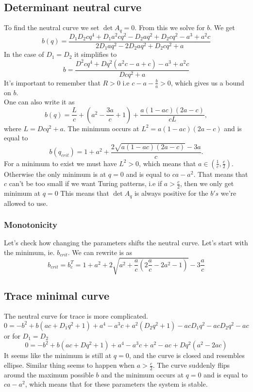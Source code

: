 \documentclass{article}
\begin{document}
\subsection{Determinant neutral curve}
To find the neutral curve we set 
$\det A_q = 0$. From this we solve for $b$. 
We get
\begin{equation}
b(q)=\frac{D_1 D_2 c q^4 + D_1 a^2 c q^2 - D_2 a q^2 + D_2 c q^2 - a^3 + a^2 c}{2 D_1 a q^2 - 2 D_2 a q^2 + D_2 c q^2 + a}
\end{equation}
In the case of $D_1=D_2$ it simplifies to
\begin{equation}
b=\frac{D^2 c q^4 +Dq^2(  a^2 c  -  a  +  c ) - a^3 + a^2 c}{D c q^2 + a} 
\end{equation}
It's important to remember that $R>0$ i.e $c-a-\frac{b}{a}>0$, which gives us a bound on $b$.\\
One can also write it as
\begin{equation}
b(q) = \frac{L}{c}+ (a^2-\frac{3a}{c}+1)+\frac{a(1-ac)(2a-c)}{cL},
\end{equation}
where $L= Dcq^2 + a$. The minimum occurs at $L^2 = a(1-ac)(2a-c)$ and is equal to 
\begin{equation}
b(q_{crit}) = 1+a^2 + \frac{2\sqrt{a(1-ac)(2a-c)}-3a}{c}.
\end{equation}
For a minimum to exist we must have $L^2>0$, which means that $a \in (\frac{1}{c}, \frac{c}{2})$. Otherwise the only minimum is at $q=0$ and is equal to $ca-a^2$. That means that $c$ can't be too small if we want Turing patterns, i.e if $a>\frac{c}{2}$, then we only get minimum at $q=0$ This means that $\det A_q$ is always positive for the $b's$ we're allowed to use.
\subsubsection{Monotonicity}
Let's check how changing the parameters shifts the neutral curve.
Let's start with the minimum, ie. $b_{crit}$.
We can rewrite is as 
\begin{equation}
b_{crit} = b_c^T = 1+a^2 + 2\sqrt{a^2+\frac{a}{c}(2\frac{a}{c}-2a^2-1)}-3\frac{a}{c}
\end{equation}
\subsection{Trace minimal curve}
The neutral curve  for trace is more complicated. 
\begin{equation}
0=-b^2 + b \left(a c+D_1 q^2+1\right)+a^4-a^3 c+a^2 \left(D_2 q^2+1\right)-a c D_1 q^2-a c D_2 q^2-a c
\end{equation}
or for $D_1=D_2$
\begin{equation}
0 = -b^2 + b \left(a c+D q^2+1\right) + a^4-a^3c+a^2-ac + Dq^2(a^2-2ac)
\end{equation}
It seems like the minimum is still at $q=0$, and the curve is closed and resembles ellipse.
Similar thing seems to happen when $a>\frac{c}{2}$. The curve suddenly flips around the maximum possible $b$ and the minimum occurs at $q=0$ and is equal to $ca-a^2$, which means that for these parameters the system is stable.
\end{document}
